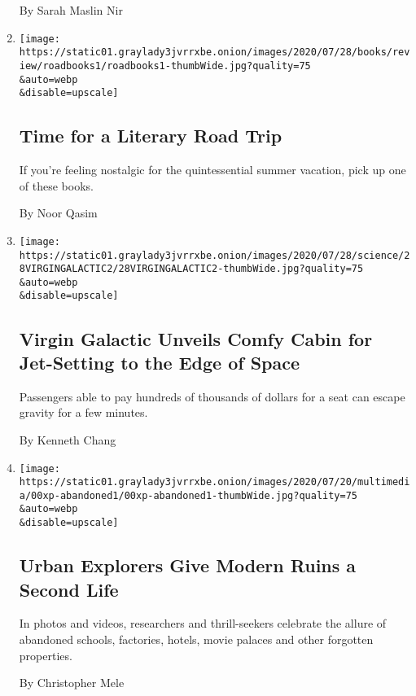 \begin{enumerate}
  By Sarah Maslin Nir
\item
  \href{/2020/07/28/books/time-for-a-literary-road-trip.html}{}

  \texttt{[image: https://static01.graylady3jvrrxbe.onion/images/2020/07/28/books/review/roadbooks1/roadbooks1-thumbWide.jpg?quality=75\\\&auto=webp\\\&disable=upscale]}

  \hypertarget{time-for-a-literary-road-trip}{%
  \subsection{Time for a Literary Road
  Trip}\label{time-for-a-literary-road-trip}}

  If you're feeling nostalgic for the quintessential summer vacation,
  pick up one of these books.

  By Noor Qasim
\item
  \href{/2020/07/28/science/virgin-galactic-cabin.html}{}

  \texttt{[image: https://static01.graylady3jvrrxbe.onion/images/2020/07/28/science/28VIRGINGALACTIC2/28VIRGINGALACTIC2-thumbWide.jpg?quality=75\\\&auto=webp\\\&disable=upscale]}

  \hypertarget{virgin-galactic-unveils-comfy-cabin-for-jet-setting-to-the-edge-of-space}{%
  \subsection{Virgin Galactic Unveils Comfy Cabin for Jet-Setting to the
  Edge of
  Space}\label{virgin-galactic-unveils-comfy-cabin-for-jet-setting-to-the-edge-of-space}}

  Passengers able to pay hundreds of thousands of dollars for a seat can
  escape gravity for a few minutes.

  By Kenneth Chang
\item
  \href{/2020/07/27/us/abandoned-properties-to-explore.html}{}

  \texttt{[image: https://static01.graylady3jvrrxbe.onion/images/2020/07/20/multimedia/00xp-abandoned1/00xp-abandoned1-thumbWide.jpg?quality=75\\\&auto=webp\\\&disable=upscale]}

  \hypertarget{urban-explorers-give-modern-ruins-a-second-life}{%
  \subsection{Urban Explorers Give Modern Ruins a Second
  Life}\label{urban-explorers-give-modern-ruins-a-second-life}}

  In photos and videos, researchers and thrill-seekers celebrate the
  allure of abandoned schools, factories, hotels, movie palaces and
  other forgotten properties.

  By Christopher Mele
\end{enumerate}

